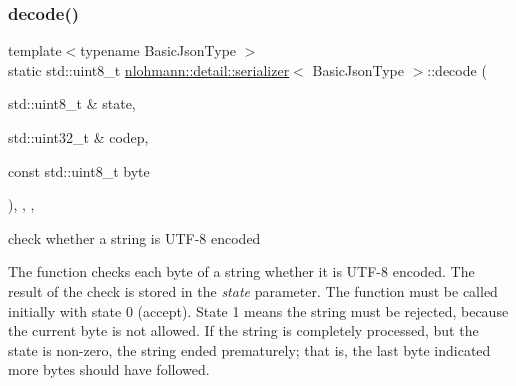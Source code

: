 \subsubsection{\texorpdfstring{decode()}{decode()}}
{\footnotesize\ttfamily template$<$typename Basic\+Json\+Type $>$ \\
static std\+::uint8\+\_\+t \mbox{\hyperlink{classnlohmann_1_1detail_1_1serializer}{nlohmann\+::detail\+::serializer}}$<$ Basic\+Json\+Type $>$\+::decode (\begin{DoxyParamCaption}\item[{std\+::uint8\+\_\+t \&}]{state,  }\item[{std\+::uint32\+\_\+t \&}]{codep,  }\item[{const std\+::uint8\+\_\+t}]{byte }\end{DoxyParamCaption})\hspace{0.3cm}{\ttfamily [inline]}, {\ttfamily [static]}, {\ttfamily [private]}, {\ttfamily [noexcept]}}



check whether a string is U\+T\+F-\/8 encoded 

The function checks each byte of a string whether it is U\+T\+F-\/8 encoded. The result of the check is stored in the {\itshape state} parameter. The function must be called initially with state 0 (accept). State 1 means the string must be rejected, because the current byte is not allowed. If the string is completely processed, but the state is non-\/zero, the string ended prematurely; that is, the last byte indicated more bytes should have followed.


